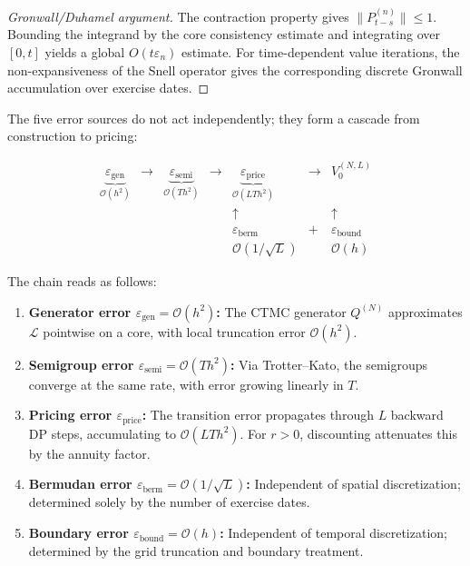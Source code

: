 \documentclass[11pt,a4paper,openany]{book}
\theoremstyle{definition}
\theoremstyle{plain}
\theoremstyle{remark}
\newcommand{\1}{\mathbbm{1}}
\begin{document}
\begin{proof}[Gronwall/Duhamel argument]
The contraction property gives $\|P_{t-s}^{(n)}\|\le1$. Bounding the integrand by the core consistency estimate and integrating over $[0,t]$ yields a global $O(t\varepsilon_n)$ estimate. For time-dependent value iterations, the non-expansiveness of the Snell operator gives the corresponding discrete Gronwall accumulation over exercise dates.
\end{proof}

The five error sources do not act independently; they form a cascade from construction to pricing:

\[
\boxed{\begin{array}{ccccccc}
\underbrace{\varepsilon_{\text{gen}}}_{\mathcal{O}(h^{2})}
& \longrightarrow &
\underbrace{\varepsilon_{\text{semi}}}_{\mathcal{O}(T h^{2})}
& \longrightarrow &
\underbrace{\varepsilon_{\text{price}}}_{\mathcal{O}(L T h^{2})}
& \longrightarrow &
V_{0}^{(N,L)} \\[6pt]
& & & & \uparrow & & \uparrow \\[6pt]
& & & & \varepsilon_{\text{berm}} & + & \varepsilon_{\text{bound}} \\[6pt]
& & & & \mathcal{O}(1/\sqrt{L}) & & \mathcal{O}(h)
\end{array}}
\]

The chain reads as follows:
\begin{enumerate}[label=(\arabic*)]
    \item \textbf{Generator error $\varepsilon_{\text{gen}} = \mathcal{O}(h^{2})$:} The CTMC generator $Q^{(N)}$ approximates $\mathcal{L}$ pointwise on a core, with local truncation error $\mathcal{O}(h^{2})$.
    \item \textbf{Semigroup error $\varepsilon_{\text{semi}} = \mathcal{O}(T h^{2})$:} Via Trotter--Kato, the semigroups converge at the same rate, with error growing linearly in $T$.
    \item \textbf{Pricing error $\varepsilon_{\text{price}}$:} The transition error propagates through $L$ backward DP steps, accumulating to $\mathcal{O}(L T h^{2})$. For $r>0$, discounting attenuates this by the annuity factor.
    \item \textbf{Bermudan error $\varepsilon_{\text{berm}} = \mathcal{O}(1/\sqrt{L})$:} Independent of spatial discretization; determined solely by the number of exercise dates.
    \item \textbf{Boundary error $\varepsilon_{\text{bound}} = \mathcal{O}(h)$:} Independent of temporal discretization; determined by the grid truncation and boundary treatment.
\end{enumerate}
\end{document}
